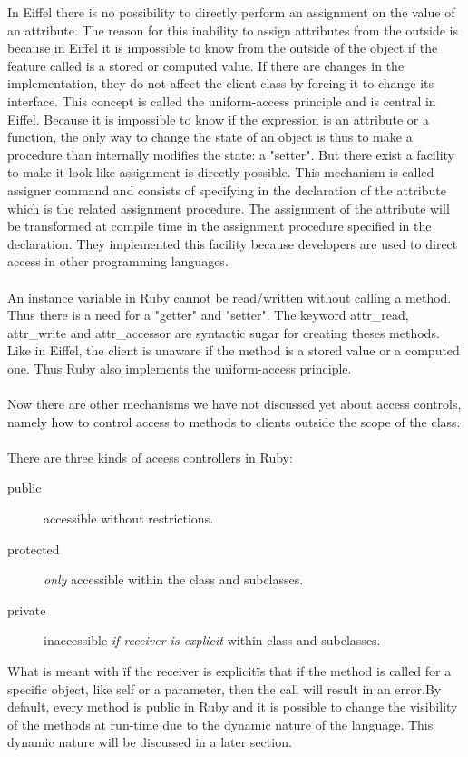 \documentclass[11pt,a4paper,twocolumn]{article}
\begin{document}
In Eiffel there is no possibility to directly perform an assignment on the value of an attribute. The reason for this inability to assign attributes from the outside is because in Eiffel it is impossible to know from the outside of the object if the feature called is a stored or computed value. If there are changes in the implementation, they do not affect the client class by forcing it to change its interface. This concept is called the uniform-access principle and is central in Eiffel. Because it is impossible to know if the expression is an attribute or a function, the only way to change the state of an object is thus to make a procedure than internally modifies the state: a "setter". But there exist a facility to make it look like assignment is directly possible. This mechanism is called assigner command and consists of specifying in the declaration of the attribute which is the related assignment procedure. The assignment of the attribute will be transformed at compile time in the assignment procedure specified in the declaration. They implemented this facility because developers are used to direct access in other programming languages.
\\
\\
An instance variable in Ruby cannot be read/written without calling a method. Thus there is a need for a  "getter" and "setter". The keyword attr\_read, attr\_write and attr\_accessor are syntactic sugar for creating theses methods. Like in Eiffel, the client is unaware if the method is a stored value or a computed one. Thus Ruby also implements the uniform-access principle.
\\
\\
Now there are other mechanisms we have not discussed yet about access controls, namely how to control access to methods to clients outside the scope of the class.
\\
\\
There are three kinds of access controllers in Ruby: 
\begin{description}
\item[public] accessible without restrictions.
\item[protected] \textit{only} accessible within the class and subclasses.
\item[private] inaccessible \textit{if receiver is explicit} within class and subclasses.
\end{description}
What is meant with \"if the receiver is explicit\"  is that if the method is called for a specific object, like self or a parameter, then the call will result in an error.By default, every method is public in Ruby and it is possible to change the visibility of the methods at run-time due to the dynamic nature of the language. This dynamic nature will be discussed in a later section.
\end{document}
